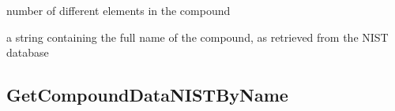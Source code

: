 \documentclass[letterpaper,10pt,english,openany,oneside]{sphinxmanual}
\begin{document}
\begin{fulllineitems}
\begin{fulllineitems}
\end{fulllineitems}


\begin{fulllineitems}
\label{\detokenize{api/nist:dxraylib.xraylib_nist_compounds.compoundDataNIST.nElements}}
\pysigstartsignatures
{}
\pysigstopsignatures
\sphinxAtStartPar
number of different elements in the compound

\end{fulllineitems}


\begin{fulllineitems}
\label{\detokenize{api/nist:dxraylib.xraylib_nist_compounds.compoundDataNIST.name}}
\pysigstartsignatures
{}
\pysigstopsignatures
\sphinxAtStartPar
a string containing the full name of the compound, as retrieved from the
NIST database

\end{fulllineitems}


\end{fulllineitems}



\subsection{GetCompoundDataNISTByName}
\label{\detokenize{api/nist:getcompounddatanistbyname}}
\end{document}
